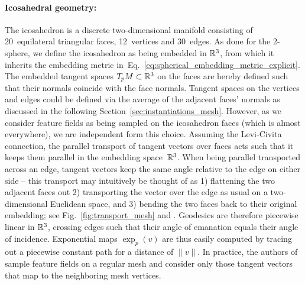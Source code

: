 \paragraph{Icosahedral geometry:}
The icosahedron is a discrete two-dimensional manifold consisting of 20~equilateral triangular faces, 12~vertices and 30~edges.
As done for the 2-sphere, we define the icosahedron as being embedded in $\mathbb{R}^3$, from which it inherits the embedding metric in~Eq.~\eqref{eq:spherical_embedding_metric_explicit}.
The embedded tangent spaces $T_{\mkern-1.5mu p}\mkern-.5muM \subset \mathbb{R}^3$ on the faces are hereby defined such that their normals coincide with the face normals.
Tangent spaces on the vertices and edges could be defined via the average of the adjacent faces' normals as discussed in the following Section~\ref{sec:instantiations_mesh}.
However, as we consider feature fields as being sampled on the icosahedron faces (which is almost everywhere), we are independent form this choice.
Assuming the Levi-Civita connection, %
the parallel transport of tangent vectors over faces acts such that it keeps them parallel in the embedding space~$\mathbb{R}^3$.
When being parallel transported across an edge, tangent vectors keep the same angle relative to the edge on either side -- this transport may intuitively be thought of as 1) flattening the two adjacent faces out 2) transporting the vector over the edge as usual on a two-dimensional Euclidean space, and 3) bending the two faces back to their original embedding; see Fig.~\ref{fig:transport_mesh} and \cite{craneDiscreteDifferentialGeometry2014}.
Geodesics are therefore piecewise linear in $\mathbb{R}^3$, crossing edges such that their angle of emanation equals their angle of incidence.
Exponential maps $\exp_p(v)$ are thus easily computed by tracing out a piecewise constant path for a distance of $\lVert v\rVert$.
In practice, the authors of~\cite{liu2018icoAltAz,gaugeIco2019,zhang2019orientation} sample feature fields on a regular mesh and consider only those tangent vectors that map to the neighboring mesh vertices.


